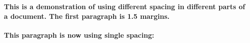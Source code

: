 \documentclass{article}%
\begin{document}

    \textbf{This is a demonstration of using different spacing in different parts of a document. The first paragraph is 1.5 margins.} \\

    \blindtext \\

    \textbf{This paragraph is now using single spacing:}\\

    \blindtext
\end{document}
